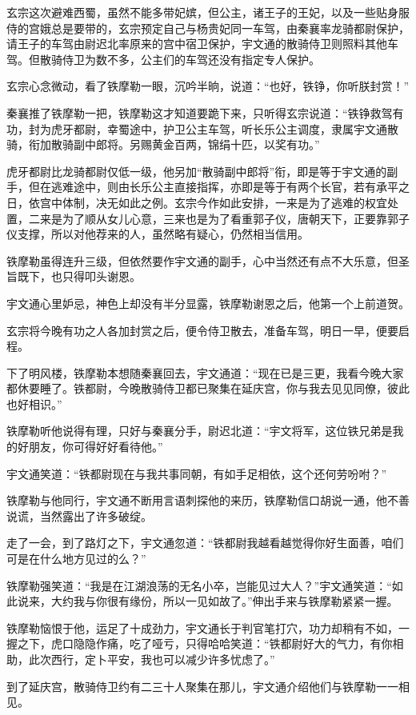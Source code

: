 \documentclass[12pt,oneside]{book}
\begin{document}
玄宗这次避难西蜀，虽然不能多带妃嫔，但公主，诸王子的王妃，以及一些贴身服侍的宫娥总是要带的，玄宗预定自己与杨贵妃同一车驾，由秦襄率龙骑都尉保护，请王子的车驾由尉迟北率原来的宫中宿卫保护，宇文通的散骑侍卫则照料其他车驾。但散骑侍卫为数不多，公主们的车驾还没有指定专人保护。

玄宗心念微动，看了铁摩勒一眼，沉吟半晌，说道：``也好，铁铮，你听朕封赏！''

秦襄推了铁摩勒一把，铁摩勒这才知道要跪下来，只听得玄宗说道：``铁铮救驾有功，封为虎牙都尉，幸蜀途中，护卫公主车驾，听长乐公主调度，隶属宇文通散骑，衔加散骑副中郎将。另赐黄金百两，锦绢十匹，以奖有功。''

虎牙都尉比龙骑都尉仅低一级，他另加``散骑副中郎将''衔，即是等于宇文通的副手，但在逃难途中，则由长乐公主直接指挥，亦即是等于有两个长官，若有承平之日，依宫中体制，决无如此之例。玄宗今作如此安排，一来是为了逃难的权宜处置，二来是为了顺从女儿心意，三来也是为了看重郭子仪，唐朝天下，正要靠郭子仪支撑，所以对他荐来的人，虽然略有疑心，仍然相当信用。

铁摩勒虽得连升三级，但依然要作宇文通的副手，心中当然还有点不大乐意，但圣旨既下，也只得叩头谢恩。

宇文通心里妒忌，神色上却没有半分显露，铁摩勒谢恩之后，他第一个上前道贺。

玄宗将今晚有功之人各加封赏之后，便令侍卫散去，准备车驾，明日一早，便要启程。

下了明风楼，铁摩勒本想随秦襄回去，宇文通道：``现在已是三更，我看今晚大家都休要睡了。铁都尉，今晚散骑侍卫都已聚集在延庆宫，你与我去见见同僚，彼此也好相识。''

铁摩勒听他说得有理，只好与秦襄分手，尉迟北道：``宇文将军，这位铁兄弟是我的好朋友，你可得好好看待他。''

宇文通笑道：``铁都尉现在与我共事同朝，有如手足相依，这个还何劳吩咐？''

铁摩勒与他同行，宇文通不断用言语刺探他的来历，铁摩勒信口胡说一通，他不善说谎，当然露出了许多破绽。

走了一会，到了路灯之下，宇文通忽道：``铁都尉我越看越觉得你好生面善，咱们可是在什么地方见过的么？''

铁摩勒强笑道：``我是在江湖浪荡的无名小卒，岂能见过大人？''宇文通笑道：``如此说来，大约我与你很有缘份，所以一见如故了。''伸出手来与铁摩勒紧紧一握。

铁摩勒恼恨于他，运足了十成劲力，宇文通长于判官笔打穴，功力却稍有不如，一握之下，虎口隐隐作痛，吃了哑亏，只得哈哈笑道：``铁都尉好大的气力，有你相助，此次西行，定卜平安，我也可以减少许多忧虑了。''

到了延庆宫，散骑侍卫约有二三十人聚集在那儿，宇文通介绍他们与铁摩勒一一相见。
\end{document}
